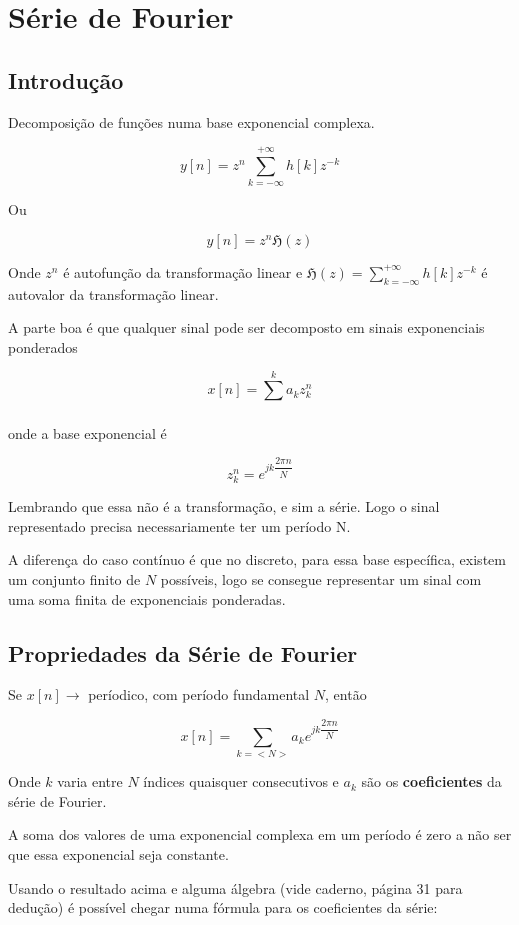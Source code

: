 \chapter{Série de Fourier}
\section{Introdução}

Decomposição de funções numa base exponencial complexa.

\[y[n] = z^{n} \sum^{+\infty}_{k = -\infty}h[k] z^{-k}\]

Ou 

\[y[n] = z^{n}\mathfrak{H}(z)\]

Onde $z^{n}$ é autofunção da transformação linear e $\mathfrak{H}(z) = \sum^{+\infty}_{k = -\infty}h[k] z^{-k}$ é autovalor da transformação linear.

A parte boa é que qualquer sinal pode ser decomposto em sinais exponenciais ponderados

\[x[n] = \sum^{k}_{}a_{k}z^n_k\]

onde a base exponencial é

\[z^n_k = e^{jk \dfrac{2 \pi n}{N}} \]

Lembrando que essa não é a transformação, e sim a série. Logo o sinal representado precisa necessariamente ter um período N.

A diferença do caso contínuo é que no discreto, para essa base específica, existem um conjunto finito de $N$ possíveis, logo se consegue representar um sinal com uma soma finita de exponenciais ponderadas.

\section{Propriedades da Série de Fourier}

Se $x[n] \rightarrow $ períodico, com período fundamental $N$, então

\[x[n] = \sum^{}_{k = <N>}a_{k}e^{jk \dfrac{2 \pi n}{N}}\]

Onde $k$ varia entre $N$ índices quaisquer consecutivos e $a_k$ são os \textbf{coeficientes} da série de Fourier.

\begin{theorem}
    A soma dos valores de uma exponencial complexa em um período é zero a não ser que essa exponencial seja constante.
\end{theorem}

Usando o resultado acima e alguma álgebra (vide caderno, página 31 para dedução) é possível chegar numa fórmula para os coeficientes da série:

